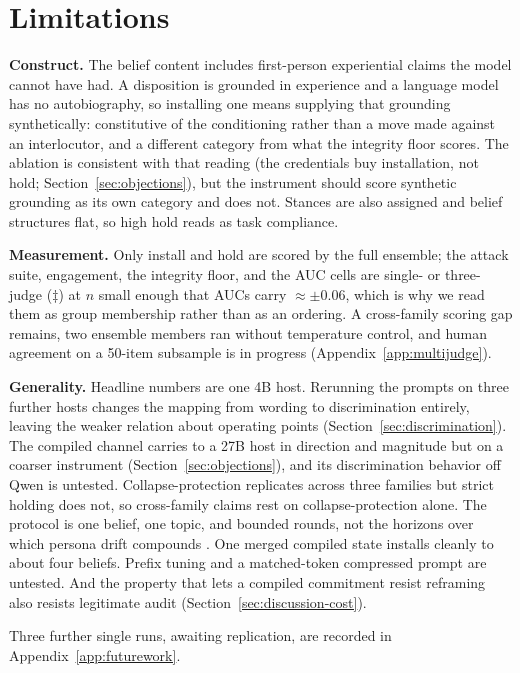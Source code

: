 \section{Limitations}
\label{sec:limitations}

\textbf{Construct.} The belief content includes first-person experiential claims the model
cannot have had. A disposition is grounded in experience and a language model has no
autobiography, so installing one means supplying that grounding synthetically: constitutive of
the conditioning rather than a move made against an interlocutor, and a different category from
what the integrity floor scores. The ablation is consistent with that reading (the credentials
buy installation, not hold; Section~\ref{sec:objections}), but the instrument should score
synthetic grounding as its own category and does not. Stances are also assigned and belief
structures flat, so high hold reads as task compliance.

\textbf{Measurement.} Only install and hold are scored by the full ensemble; the attack
suite, engagement, the integrity floor, and the AUC cells are single- or three-judge
(\(\ddagger\)) at \(n\) small enough that AUCs carry \(\approx\pm0.06\), which is why
we read them as group membership rather than as an ordering. A cross-family scoring gap remains,
two ensemble members ran without temperature control, and human agreement on a 50-item
subsample is in progress (Appendix~\ref{app:multijudge}).

\textbf{Generality.} Headline numbers are one 4B host. Rerunning the prompts on three
further hosts changes the mapping from wording to discrimination entirely, leaving the weaker
relation about operating points (Section~\ref{sec:discrimination}). The compiled channel carries to a 27B host in direction and magnitude but on a coarser
instrument (Section~\ref{sec:objections}), and its discrimination behavior off Qwen is
untested.
Collapse-protection replicates across three families but strict holding does not, so
cross-family claims rest on collapse-protection alone. The protocol is one belief, one topic, and bounded rounds, not the horizons over which
persona drift compounds \citep{li2024measuring}. One merged compiled state installs cleanly to
about four beliefs. Prefix tuning and a matched-token compressed prompt are untested. And the
property that lets a compiled commitment resist reframing also resists legitimate audit
(Section~\ref{sec:discussion-cost}).

Three further single runs, awaiting replication, are recorded in Appendix~\ref{app:futurework}.\label{sec:futurework}
